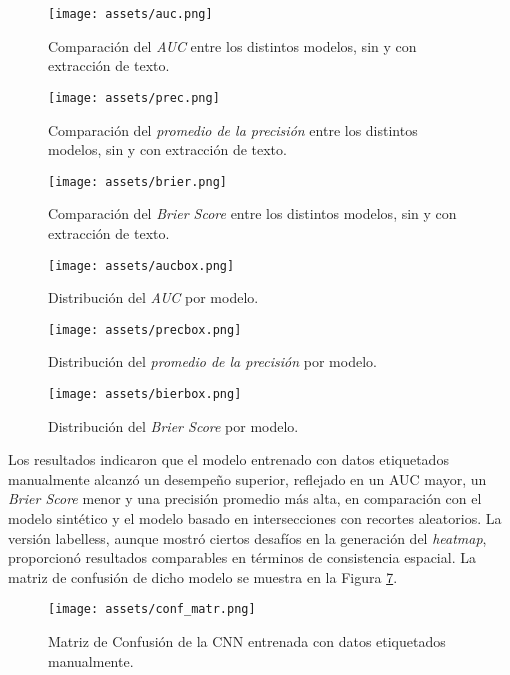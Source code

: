 \documentclass[twocolumn, fontsize=10pt]{article}
\begin{document}
\begin{figure}[H]
    \centering
    \texttt{[image: assets/auc.png]}
    \caption{Comparación del \textit{AUC} entre los distintos modelos, sin y con extracción de texto.}
    \label{fig:auc1}
\end{figure}
\begin{figure}[H]
    \centering
    \texttt{[image: assets/prec.png]}
    \caption{Comparación del \textit{promedio de la precisión} entre los distintos modelos, sin y con extracción de texto.}
    \label{fig:prec1}
\end{figure}
\begin{figure}[H]
    \centering
    \texttt{[image: assets/brier.png]}
    \caption{Comparación del \textit{Brier Score} entre los distintos modelos, sin y con extracción de texto.}
    \label{fig:brier1}
\end{figure}
\begin{figure}[H]
    \centering
    \texttt{[image: assets/aucbox.png]}
    \caption{Distribución del \textit{AUC} por modelo.}
    \label{fig:auc2}
\end{figure}
\begin{figure}[H]
    \centering
    \texttt{[image: assets/precbox.png]}
    \caption{Distribución del \textit{promedio de la precisión} por modelo.}
    \label{fig:prec2}
\end{figure}
\begin{figure}[H]
    \centering
    \texttt{[image: assets/bierbox.png]}
    \caption{Distribución del \textit{Brier Score} por modelo.}
    \label{fig:brier2}
\end{figure}


Los resultados indicaron que el modelo 
entrenado con datos etiquetados 
manualmente alcanz\'o un desempeño superior, 
reflejado en un AUC mayor, un \textit{Brier Score} 
menor y una precisi\'on promedio m\'as alta, en 
comparaci\'on con el modelo sint\'etico y el modelo 
basado en intersecciones con recortes aleatorios. 
La versi\'on labelless, aunque mostr\'o ciertos 
desaf\'ios en la generaci\'on del \textit{heatmap}, 
proporcion\'o resultados comparables en t\'erminos de 
consistencia espacial. La matriz de confusión de dicho modelo se muestra en la Figura \ref{fig:conf_matr}.

\begin{figure}[H]
    \centering
    \texttt{[image: assets/conf\_matr.png]}
    \caption{Matriz de Confusión de la CNN entrenada con datos etiquetados manualmente.}
    \label{fig:conf_matr}
\end{figure}
\end{document}
